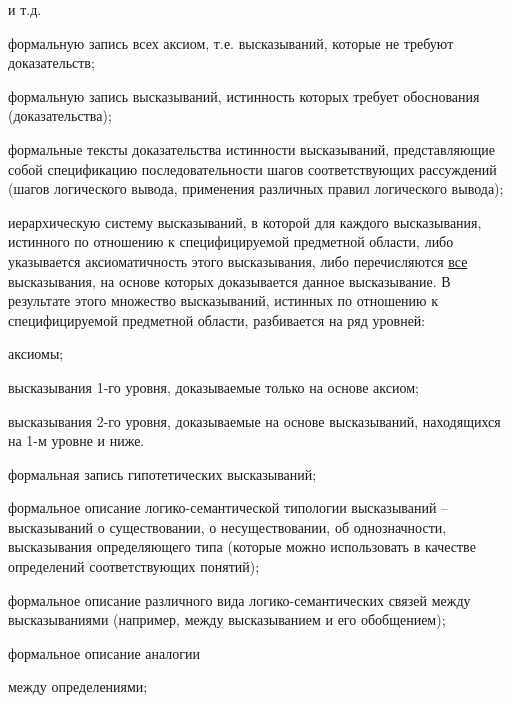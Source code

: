 \begin{SCn}
\begin{scnsubstruct}
\begin{scnsubstruct}
{\begin{scnitemize}
\begin{scnitemizeii}
                        \item и т.д.
                    \end{scnitemizeii}
                    \item формальную запись всех аксиом, т.е. высказываний, которые не требуют доказательств;
                    \item формальную запись высказываний, истинность которых требует обоснования (доказательства);
                    \item формальные тексты доказательства истинности высказываний, представляющие собой спецификацию последовательности шагов соответствующих рассуждений (шагов логического вывода, применения различных правил логического вывода);
                    \item иерархическую систему высказываний, в которой для каждого высказывания, истинного по отношению к специфицируемой предметной области, либо указывается аксиоматичность этого высказывания, либо перечисляются \uline{все} высказывания, на основе которых доказывается данное высказывание. В результате этого множество высказываний, истинных по отношению к специфицируемой предметной области, разбивается на ряд уровней:
                    \begin{scnitemizeii}
                        \item аксиомы;
                        \item высказывания 1-го уровня, доказываемые только на основе аксиом;
                        \item высказывания 2-го уровня, доказываемые на основе высказываний, находящихся на 1-м уровне и ниже.
                    \end{scnitemizeii}
                    \item формальная запись гипотетических высказываний;
                    \item формальное описание логико-семантической типологии высказываний -- высказываний о существовании, о несуществовании, об однозначности, высказывания определяющего  типа (которые можно использовать в качестве определений соответствующих понятий);
                    \item формальное описание различного вида логико-семантических связей между высказываниями (например, между высказыванием и его обобщением);
                    \item формальное описание аналогии
                    \begin{scnitemizeii}
                        \item между определениями;

\end{scnitemizeii}
\end{scnitemize}}
\end{scnsubstruct}
\end{scnsubstruct}
\end{SCn}

